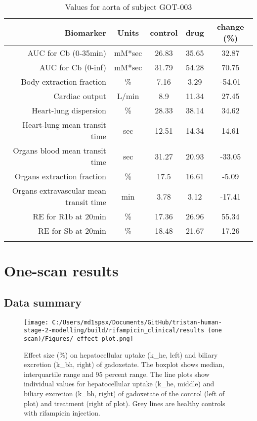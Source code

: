\documentclass{epflreport}%
\begin{document}
\begin{longtable}{rcccc}%
\hline%
Biomarker&Units&control&drug&change (\%)\\%
\hline%
AUC for Cb (0{-}35min)&mM*sec&26.83&35.65&32.87\\%
AUC for Cb (0{-}inf)&mM*sec&31.79&54.28&70.75\\%
Body extraction fraction&\%&7.16&3.29&{-}54.01\\%
Cardiac output&L/min&8.9&11.34&27.45\\%
Heart{-}lung dispersion&\%&28.33&38.14&34.62\\%
Heart{-}lung mean transit time&sec&12.51&14.34&14.61\\%
Organs blood mean transit time&sec&31.27&20.93&{-}33.05\\%
Organs extraction fraction&\%&17.5&16.61&{-}5.09\\%
Organs extravascular mean transit time&min&3.78&3.12&{-}17.41\\%
RE for R1b at 20min&\%&17.36&26.96&55.34\\%
RE for Sb at 20min&\%&18.48&21.67&17.26\\%
\hline%
\caption{Values for aorta of subject GOT-003} \\%
\end{longtable}%
\clearpage%
\chapter{One{-}scan results}%
\section{Data summary}%
\label{sec:Datasummary}%

%


\begin{figure}[h!]%
\centering%
\texttt{[image: C:/Users/md1spsx/Documents/GitHub/tristan-human-stage-2-modelling/build/rifampicin\_clinical/results (one scan)/Figures/\_effect\_plot.png]}%
\caption{Effect size (\%) on hepatocellular uptake (k\_he, left) and biliary excretion (k\_bh, right) of gadoxetate. The boxplot shows median, interquartile range and 95 percent range. The line plots show individual values for hepatocellular uptake (k\_he, middle) and biliary excretion (k\_bh, right) of gadoxetate of the control (left of plot) and treatment (right of plot). Grey lines are healthy controls with rifampicin injection.}%
\end{figure}
\end{document}
